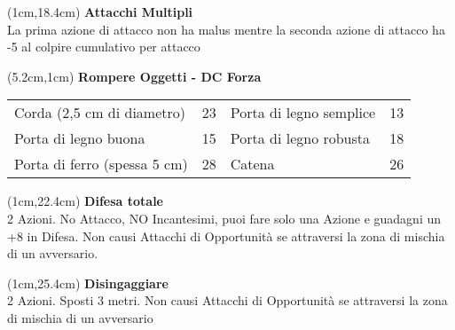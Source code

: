 \documentclass[a4paper,12 pt,openany]{book}
\begin{document}
\begin{textblock*}{4cm}(1cm,18.4cm) %
	\textbf{Attacchi Multipli}\\
	La prima azione di attacco non ha malus mentre la seconda azione di attacco ha -5 al colpire cumulativo per attacco
\end{textblock*}




\begin{textblock*}{15cm}(5.2cm,1cm) %
\textbf{Rompere Oggetti - DC Forza}\\
\begin{tabular}{ll|ll}	
	Corda (2,5 cm di diametro)               & 23&	Porta di legno semplice                 & 13\\
	Porta di legno buona                    & 15&Porta di legno robusta               & 18\\
	Porta di ferro (spessa 5 cm)           & 28&	Catena                                 & 26 \\		
\end{tabular}

\end{textblock*}


\begin{textblock*}{8cm}(1cm,22.4cm) %
\textbf{Difesa totale}\\
2 Azioni. No Attacco, NO Incantesimi, puoi fare solo una Azione e guadagni un +8 in Difesa. Non causi Attacchi di Opportunità se attraversi la zona di mischia di un avversario.
\end{textblock*}

\begin{textblock*}{8cm}(1cm,25.4cm) %
\textbf{Disingaggiare}\\
2 Azioni. Sposti 3 metri. Non causi Attacchi di Opportunità se attraversi la zona di mischia di un avversario
\end{textblock*}
\end{document}
